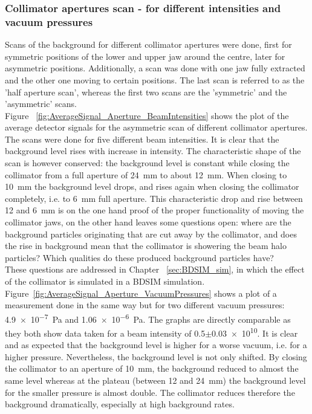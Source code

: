 \subsubsection{Collimator apertures scan - for different intensities and vacuum pressures}
\label{aperture_scans}
Scans of the background for different collimator apertures were done, first for symmetric positions of the lower and upper jaw around the centre, later for asymmetric positions. Additionally, a scan was done with one jaw fully extracted and the other one moving to certain positions. The last scan is referred to as the 'half aperture scan', whereas the first two scans are the 'symmetric' and the 'asymmetric' scans.\\
Figure ~\ref{fig:AverageSignal_Aperture_BeamIntensities} shows the plot of the average detector signals for the asymmetric scan of different collimator apertures. The scans were done for five different beam intensities. It is clear that the background level rises with increase in intensity. The characteristic shape of the scan is however conserved: the background level is constant while closing the collimator from a full aperture of \SI{24}{\milli\metre} to about \SI{12}{\milli\metre}. When closing to \SI{10}{\milli\metre} the background level drops, and rises again when closing the collimator completely, i.e. to \SI{6}{\milli\metre} full aperture. This characteristic drop and rise between 12 and \SI{6}{\milli\metre} is on the one hand proof of the proper functionality of moving the collimator jaws, on the other hand leaves some questions open: where are the background particles originating that are cut away by the collimator, and does the rise in background mean that the collimator is showering the beam halo particles? Which qualities do these produced background particles have?\\
These questions are addressed in Chapter ~\ref{sec:BDSIM_sim}, in which the effect of the collimator is simulated in a BDSIM simulation.
\newline
Figure~\ref{fig:AverageSignal_Aperture_VacuumPressures} shows a plot of a measurement done in the same way but for two different vacuum pressures: \SI{4.9e-7}{\pascal} and \SI{1.06e-6}{\pascal}. The graphs are directly comparable as they both show data taken for a beam intensity of \num{0.5}$\pm$\num{0.03e10}. It is clear and as expected that the background level is higher for a worse vacuum, i.e. for a higher pressure. Nevertheless, the background level is not only shifted. By closing the collimator to an aperture of \SI{10}{\milli\metre}, the background reduced to almost the same level whereas at the plateau (between 12 and \SI{24}{\milli\metre}) the background level for the smaller pressure is almost double. The collimator reduces therefore the background dramatically, especially at high background rates.

